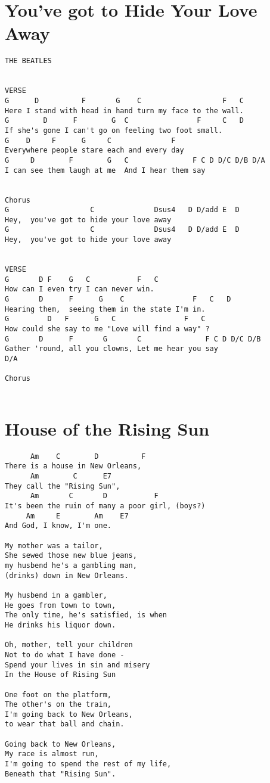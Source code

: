 \documentclass[leqno]{memoir}
\begin{document}
\chapter{You've got to Hide Your Love Away}
\begin{verbatim}
THE BEATLES


VERSE
G      D          F       G    C                   F   C
Here I stand with head in hand turn my face to the wall.
G        D      F        G  C                F     C   D
If she's gone I can't go on feeling two foot small.
G    D     F      G     C              F
Everywhere people stare each and every day
G     D        F        G   C               F C D D/C D/B D/A
I can see them laugh at me  And I hear them say


Chorus
G                   C              Dsus4   D D/add E  D
Hey,  you've got to hide your love away
G                   C              Dsus4   D D/add E  D
Hey,  you've got to hide your love away


VERSE
G       D F    G   C           F   C
How can I even try I can never win.
G       D      F      G    C                F   C   D
Hearing them,  seeing them in the state I'm in.
G         D   F      G   C                F   C
How could she say to me "Love will find a way" ?
G       D      F       G       C               F C D D/C D/B
Gather 'round, all you clowns, Let me hear you say
D/A

Chorus


\end{verbatim}
\newpage

\chapter{House of the Rising Sun}
\begin{verbatim}
      Am    C        D          F
There is a house in New Orleans,
      Am        C      E7
They call the "Rising Sun",
      Am       C       D           F
It's been the ruin of many a poor girl, (boys?)
     Am     E        Am    E7
And God, I know, I'm one.

My mother was a tailor,
She sewed those new blue jeans,
my husbend he's a gambling man,
(drinks) down in New Orleans.

My husbend in a gambler,
He goes from town to town,
The only time, he's satisfied, is when
He drinks his liquor down.

Oh, mother, tell your children
Not to do what I have done -
Spend your lives in sin and misery
In the House of Rising Sun

One foot on the platform,
The other's on the train,
I'm going back to New Orleans,
to wear that ball and chain.

Going back to New Orleans,
My race is almost run,
I'm going to spend the rest of my life,
Beneath that "Rising Sun".

\end{verbatim}
\newpage
\end{document}
